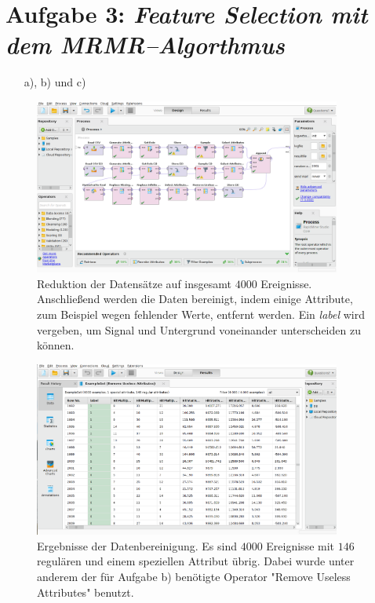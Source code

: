 \section*{Aufgabe 3: \emph{Feature Selection mit dem MRMR--Algorthmus}}
\begin{itemize}
\item[a), b) und c)]
\end{itemize}
\begin{figure}[H]
	\centering
	\includegraphics[width=0.9\textwidth]{Rapidminer/Datenbereinigung.png}
	\caption{Reduktion der Datensätze auf insgesamt $4000$ Ereignisse. Anschließend werden die Daten bereinigt, indem einige Attribute, zum Beispiel wegen fehlender Werte, entfernt werden. Ein \emph{label} wird vergeben, um Signal und Untergrund voneinander unterscheiden zu können.}
\end{figure}

\begin{figure}[H]
	\centering
	\includegraphics[width=0.9\textwidth]{Rapidminer/Datenbereinigung_2.png}
	\caption{Ergebnisse der Datenbereinigung. Es sind $4000$ Ereignisse mit $146$ regulären und einem speziellen Attribut übrig. Dabei wurde unter anderem der für Aufgabe b) benötigte Operator "Remove Useless Attributes" benutzt.}
\end{figure}

